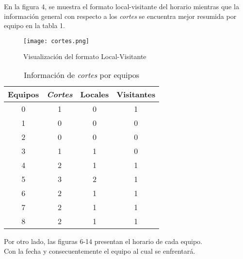\documentclass[11pt]{article}
\begin{document}
\begin{multicols}{2}
            En la figura 4, se muestra el formato local-visitante del horario mientras que la información general con respecto a los \textit{cortes} se encuentra mejor resumida por equipo en la tabla 1.
            \begin{figure}[H]
                \begin{center}
                    \texttt{[image: cortes.png]}  
                \caption{Visualización del formato Local-Visitante}
                \end{center}
            \end{figure}
           
            \begin{table}[H]
                \centering
                \begin{tabular}{|c||c|c|c|}
                    \hline
                    Equipos & \textit{Cortes} & Locales & Visitantes\\ \hline
                    0 & 1 & 0 & 1\\ \hline
                    1 & 0 & 0 & 0\\ \hline
                    2 & 0 & 0 & 0\\ \hline
                    3 & 1 & 1 & 0\\ \hline
                    4 & 2 & 1 & 1\\ \hline
                    5 & 3 & 2 & 1\\ \hline
                    6 & 2 & 1 & 1\\ \hline
                    7 & 2 & 1 & 1\\ \hline
                    8 & 2 & 1 & 1\\ \hline
                \end{tabular} 
                \caption{Información de \textit{cortes} por equipos}
            \end{table}
            
            Por otro lado, las figuras 6-14 presentan el horario de cada equipo.\\
            Con la fecha y consecuentemente el equipo al cual se enfrentará.
            

\end{multicols}
\end{document}
